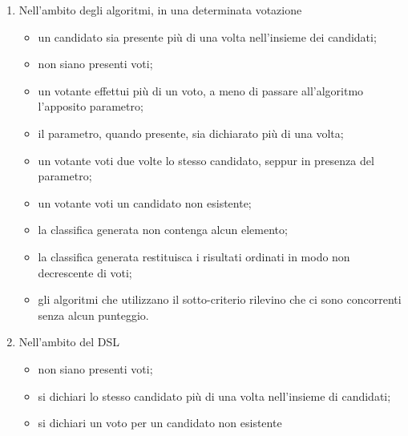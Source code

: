 \documentclass[12pt,a4paper,openright,twoside]{book}
\begin{document}
\begin{enumerate}
    \item{Nell'ambito degli algoritmi, in una determinata votazione
        \begin{itemize}
        \item{un candidato sia presente più di una volta nell'insieme dei candidati;}
        \item{non siano presenti voti;}
        \item{un votante effettui più di un voto, a meno di passare all'algoritmo l'apposito parametro;}
        \item{il parametro, quando presente, sia dichiarato più di una volta;}
        \item{un votante voti due volte lo stesso candidato, seppur in presenza del parametro;}
        \item{un votante voti un candidato non esistente;}
        \item{la classifica generata non contenga alcun elemento;}
        \item{la classifica generata restituisca i risultati ordinati in modo non decrescente di voti;}
        \item{gli algoritmi che utilizzano il sotto-criterio rilevino che ci sono concorrenti senza alcun punteggio.}
        \end{itemize}}
    \item{Nell'ambito del DSL
        \begin{itemize}
            \item{non siano presenti voti;}
            \item{si dichiari lo stesso candidato più di una volta nell'insieme di candidati;}
            \item{si dichiari un voto per un candidato non esistente}
        \end{itemize}
    }

\end{enumerate}
\end{document}

